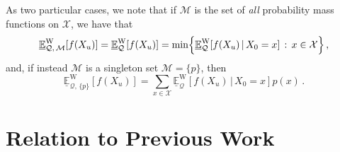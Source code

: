 \documentclass[10pt,a4paper]{paper}
\theoremstyle{definition}
\newcommand{\states}{\mathcal{X}}
\newcommand{\gambles}{\mathcal{L}}
\newcommand{\rateset}{\mathcal{Q}}
\newcommand{\lrate}{\underline{Q}}
\newcommand{\norm}[1]{\left\lVert #1 \right\rVert}
\begin{document}
As two particular cases, we note that if $\mathcal{M}$ is the set of \emph{all} probability mass functions on $\states$, we have that
\begin{equation*}
\underline{\mathbb{E}}_{\rateset,\,\mathcal{M}}^\mathrm{W}[f(X_u)] = \underline{\mathbb{E}}_{\rateset}^\mathrm{W}[f(X_u)] = \min\Bigl\{  \underline{\mathbb{E}}_{\rateset}^\mathrm{W}[f(X_u)\,\vert\,X_0=x] \,:\,x\in\states\Bigr\}\,,
\end{equation*}
and, if instead $\mathcal{M}$ is a singleton set $\mathcal{M}=\{p\}$, then
\begin{equation*}
\underline{\mathbb{E}}_{\rateset,\,\{p\}}^\mathrm{W}[f(X_u)] = \sum_{x\in\states} \underline{\mathbb{E}}_{\rateset}^\mathrm{W}[f(X_u)\,\vert\,X_0=x]p(x)\,.
\end{equation*}

%
%
%




\section{Relation to Previous Work}\label{sec:prev_work}
\end{document}
